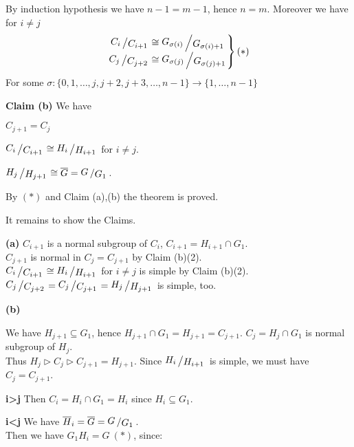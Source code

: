 \documentclass[12pt]{book}
\newcommand{\slant}[2]{{\raisebox{.1em}{$#1$}\left/\raisebox{-.1em}{$#2$}\right.}}
\begin{document}
\begin{spacing}{1.3}
\begin{compactitem}
By induction hypothesis we have $n-1=m-1$, hence $n=m$. Moreover we have for $i \neq j$
$$\left.\begin{matrix} \slant{C_i}{C_{i+1}} \cong \slant{G_{\sigma(i)}}{G_{\sigma(i)+1}} \\ \slant{C_j}{C_{j+2}} \cong \slant{G_{\sigma(j)}}{G_{\sigma(j)+1}} \end{matrix} \right\} (*)$$
For some $\sigma: \{0,1, \ldots, j,j+2,j+3, \ldots, n-1\} \longrightarrow \{1, \ldots, n-1\}$
\begin{compactenum}
\item[\textbf{Claim (b)}] We have
\begin{compactenum}
\item $C_{j+1}=C_j$
\item $\slant{C_i}{C_{i+1}} \cong \slant{H_i}{H_{i+1}}$ for $i \neq j$.
\item $\slant{H_j}{H_{j+1}} \cong \overline{G} = \slant{G}{G_1}$.
\end{compactenum}
\end{compactenum}
By $(*)$ and Claim (a),(b) the theorem is proved.
\end{compactitem}
It remains to show the Claims.
\begin{compactenum}
\item[\textbf{(a)}] $C_{i+1}$ is a normal subgroup of $C_i$, $C_{i+1}=H_{i+1} \cap G_1$.\\
$C_{j+1}$ is normal in $C_j=C_{j+1}$ by Claim (b)(2).\\
$\slant{C_{i}}{C_{i+1}} \cong \slant{H_i}{H_{i+1}}$ for $i \neq j$ is simple by Claim (b)(2).\\
$\slant{C_j}{C_{j+2}} = \slant{C_j}{C_{j+1}} = \slant{H_j}{H_{j+1}}$ is simple, too. 
\item[\textbf{(b)}] \begin{compactenum}
\item We have $H_{j+1} \subseteq G_1$, hence $H_{j+1}\cap G_1=H_{j+1}=C_{j+1}$. $C_j=H_j \cap G_1$ is normal subgroup of $H_j$.\\
Thus $H_j \triangleright C_j \triangleright C_{j+1}=H_{j+1}$. Since $\slant{H_i}{H_{i+1}}$ is simple, we must have $C_j=C_{j+1}$.
\item \begin{compactenum}
\item[\bf{i>j}] Then $C_i=H_i \cap G_1=H_i$ since $H_i \subseteq G_1$.
\item[\bf{i<j}] We have $\overline{H}_i=\overline{G}=\slant{G}{G_1}$.\\
Then we have $G_1 H_i=G \ (*)$, since:

\end{compactenum}
\end{compactenum}
\end{compactenum}
\end{spacing}
\end{document}
